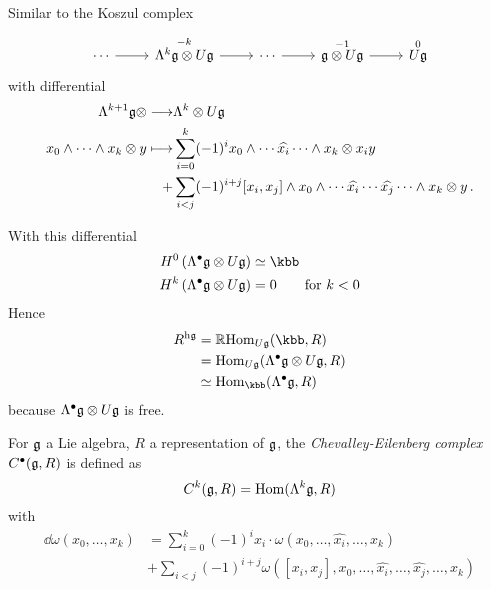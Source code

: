 Similar to the Koszul complex
\begin{equation*}
    \begin{tikzcd}
    \cdots \arrow[r] &
    \overset{-k}{\Lambda^k\gfrak\otimes U\gfrak} \arrow[r] &
    \cdots \arrow[r] &
    \overset{-1}{\gfrak\otimes U\gfrak} \arrow[r] &
    \overset{0}{U\gfrak}
  \end{tikzcd}
\end{equation*}
with differential
\begin{align*}
  \Lambda^{k+1}\mathfrak{g}\otimes\longrightarrow&\Lambda^k\otimes{}U\mathfrak{g}\\
  x_0\wedge\cdots\wedge{}x_k\otimes y \longmapsto& \sum_{i=0}^k (-1)^i x_0\wedge\cdots\widehat{x_i}\cdots\wedge x_k \otimes x_i y\\
  +&\sum_{i<j} (-1)^{i+j} [x_i,x_j]\wedge x_0\wedge\cdots\widehat{x_i}\cdots\widehat{x_j}\cdots\wedge x_k \otimes y\,.
\end{align*}

With this differential
\begin{align*}
  H^0 \left(\Lambda^\bullet\gfrak\otimes U\gfrak\right)&\simeq \kbb\\ %
  H^k \left(\Lambda^\bullet\gfrak\otimes U\gfrak\right)&=0 \qquad \text{for $k<0$}
\end{align*}
Hence
\begin{align*}
  R^{\mathrm{h}\gfrak}&=\Rbb\mathrm{Hom}_{U\gfrak} (\kbb, R)\\
                      &=\mathrm{Hom}_{U\gfrak} (\Lambda^{\bullet}\gfrak\otimes U\gfrak, R)\\
                      &\simeq\mathrm{Hom}_{\kbb} (\Lambda^{\bullet}\gfrak, R)
\end{align*}
because $\Lambda^\bullet\mathfrak{g}\otimes{}U\mathfrak{g}$ is free.

\begin{definition}
  For $\mathfrak{g}$ a Lie algebra, $R$ a representation of $\mathfrak{g}$, the
  {\em Chevalley-Eilenberg complex} $C^\bullet (\mathfrak{g},R)$ is defined as
  \begin{equation*}
    C^k (\mathfrak{g},R)=\mathrm{Hom} (\Lambda^k\mathfrak{g},R)
  \end{equation*}
  with
  \begin{align*}
    \dd\omega (x_0,\ldots,x_k)&=\sum_{i=0}^{k} (-1)^i x_i\cdot\omega (x_0,\ldots,\widehat{x_i},\ldots,x_k)\\
                              &+\sum_{i<j} (-1)^{i+j} \omega ([x_i,x_j],x_0,\ldots,\widehat{x_i},\ldots,\widehat{x_j},\ldots,x_k)
  \end{align*}
\end{definition}


